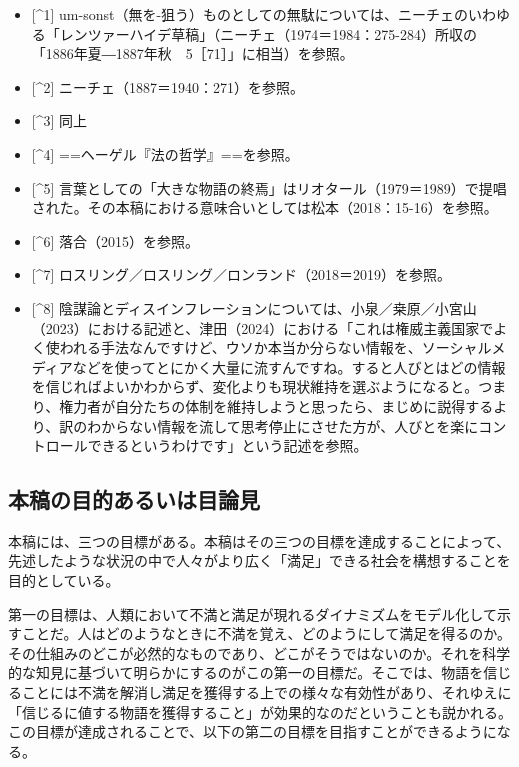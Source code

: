 \begin{itemize}
\tightlist
\item
  {[}\^{}1{]}
  um-sonst（無を-狙う）ものとしての無駄については、ニーチェのいわゆる「レンツァーハイデ草稿」（ニーチェ（1974＝1984：275-284）所収の「1886年夏―1887年秋　5［71］」に相当）を参照。
\item
  {[}\^{}2{]} ニーチェ（1887＝1940：271）\cite{key1}を参照。
\item
  {[}\^{}3{]} 同上
\item
  {[}\^{}4{]} ==ヘーゲル『法の哲学』==を参照。
\item
  {[}\^{}5{]}
  言葉としての「大きな物語の終焉」はリオタール（1979＝1989）で提唱された。その本稿における意味合いとしては松本（2018：15-16）を参照。
\item
  {[}\^{}6{]} 落合（2015）を参照。
\item
  {[}\^{}7{]} ロスリング／ロスリング／ロンランド（2018＝2019）を参照。
\item
  {[}\^{}8{]}
  陰謀論とディスインフレーションについては、小泉／桒原／小宮山（2023）における記述と、津田（2024）における「これは権威主義国家でよく使われる手法なんですけど、ウソか本当か分らない情報を、ソーシャルメディアなどを使ってとにかく大量に流すんですね。すると人びとはどの情報を信じればよいかわからず、変化よりも現状維持を選ぶようになると。つまり、権力者が自分たちの体制を維持しようと思ったら、まじめに説得するより、訳のわからない情報を流して思考停止にさせた方が、人びとを楽にコントロールできるというわけです」という記述を参照。
\end{itemize}

\subsection{本稿の目的あるいは目論見}\label{ux672cux7a3fux306eux76eeux7684ux3042ux308bux3044ux306fux76eeux8ad6ux898b}

本稿には、三つの目標がある。本稿はその三つの目標を達成することによって、先述したような状況の中で人々がより広く「満足」できる社会を構想することを目的としている。

第一の目標は、人類において不満と満足が現れるダイナミズムをモデル化して示すことだ。人はどのようなときに不満を覚え、どのようにして満足を得るのか。その仕組みのどこが必然的なものであり、どこがそうではないのか。それを科学的な知見に基づいて明らかにするのがこの第一の目標だ。そこでは、物語を信じることには不満を解消し満足を獲得する上での様々な有効性があり、それゆえに「信じるに値する物語を獲得すること」が効果的なのだということも説かれる。この目標が達成されることで、以下の第二の目標を目指すことができるようになる。

